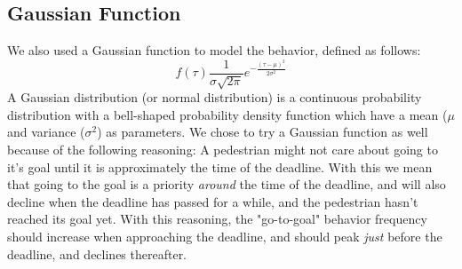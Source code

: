 \documentclass[11pt, a4paper]{book}
\begin{document}
\subsection{Gaussian Function}
We also used a Gaussian function to model the behavior, defined as follows:
\begin{equation}f(\tau)\frac{1}{\sigma \sqrt{2 \pi}} e^{- \frac{(\tau - \mu)^2}{2\sigma^2}}
\end{equation}
A Gaussian distribution (or normal distribution) is a continuous probability distribution with a bell-shaped probability density function which have a mean ($\mu$ and variance ($\sigma^2$) as parameters.
We chose to try a Gaussian function as well because of the following reasoning: A pedestrian might not care about going to it's goal until it is approximately the time of the deadline. With this we mean that going to the goal is a priority \emph{around} the time of the deadline, and will also decline when the deadline has passed for a while, and the pedestrian hasn't reached its goal yet. With this reasoning, the "go-to-goal" behavior frequency should increase when approaching the deadline, and should peak \emph{just} before the deadline, and declines thereafter.
\end{document}
